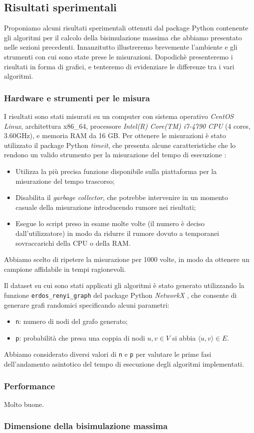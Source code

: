 \subsection{Risultati sperimentali}
Proponiamo alcuni risultati sperimentali ottenuti dal package Python contenente gli algoritmi per il calcolo della bisimulazione massima che abbiamo presentato nelle sezioni precedenti. Innanzitutto illustreremo brevemente l'ambiente e gli strumenti con cui sono state prese le misurazioni. Dopodichè presenteremo i risultati in forma di grafici, e tenteremo di evidenziare le differenze tra i vari algoritmi.

\subsubsection{Hardware e strumenti per le misura}
I risultati sono stati misurati su un computer con sistema operativo \emph{CentOS Linux}, architettura x86\_64, processore \emph{Intel(R) Core(TM) i7-4790 CPU} (4 cores, 3.60GHz), e memoria RAM da 16 GB. Per ottenere le misurazioni è stato utilizzato il package Python \emph{timeit}, che presenta alcune caratteristiche che lo rendono un valido strumento per la misurazione del tempo di esecuzione \cite{pythondocs}:
\begin{itemize}
    \item Utilizza la più precisa funzione disponibile sulla piattaforma per la misurazione del tempo trascorso;
    \item Disabilita il \emph{garbage collector}, che potrebbe intervenire in un momento casuale della misurazione introducendo rumore nei risultati;
    \item Esegue lo script preso in esame molte volte (il numero è deciso dall'utilizzatore) in modo da ridurre il rumore dovuto a temporanei sovraccarichi della CPU o della RAM.
\end{itemize}
Abbiamo scelto di ripetere la misurazione per 1000 volte, in modo da ottenere un campione affidabile in tempi ragionevoli.

Il dataset su cui sono stati applicati gli algoritmi è stato generato utilizzando la funzione \verb|erdos_renyi_graph| del package Python \emph{NetworkX} \cite{networkx}, che consente di generare grafi randomici specificando alcuni parametri:
\begin{itemize}
    \item \verb|n|: numero di nodi del grafo generato;
    \item \verb|p|: probabilità che presa una coppia di nodi $u,v \in V$ si abbia $\langle u,v\rangle \in E$.
\end{itemize}
Abbiamo considerato diversi valori di \verb|n| e \verb|p| per valutare le prime fasi dell'andamento asintotico del tempo di esecuzione degli algoritmi implementati.

\subsubsection{Performance}
Molto buone.

\subsubsection{Dimensione della bisimulazione massima}

